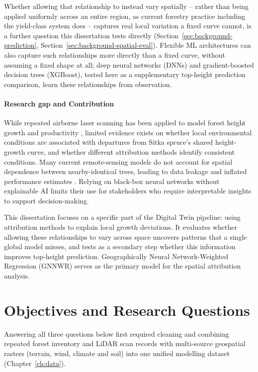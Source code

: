 \documentclass[logo,msc,ai]{infthesis}           %
\begin{document}
Whether allowing that relationship to instead vary spatially -- rather than being applied uniformly across an entire region, as current forestry practice including the yield-class system does -- captures real local variation a fixed curve cannot, is a further question this dissertation tests directly (Section~\ref{sec:background-prediction}, Section~\ref{sec:background-spatial-eval}). Flexible ML architectures can also capture such relationships more directly than a fixed curve, without assuming a fixed shape at all; deep neural networks (DNNs) and gradient-boosted decision trees (XGBoost), tested here as a supplementary top-height prediction comparison, learn these relationships from observation.

\paragraph*{Research gap and Contribution}
While repeated airborne laser scanning has been applied to model forest height growth and productivity \cite{janiec2023Development_C1_SS}, limited evidence exists on whether local environmental conditions are associated with departures from Sitka spruce's shared height-growth curve, and whether different attribution methods identify consistent conditions. Many current remote-sensing models do not account for spatial dependence between nearby-identical trees, leading to data leakage and inflated performance estimates \cite{Karasiak2022Spatial_C5_EVAL, ploton2020Spatial_C5_EVAL, lynch2025Digital_C4_NN}. Relying on black-box neural networks without explainable AI limits their use for stakeholders who require interpretable insights to support decision-making.

This dissertation focuses on a specific part of the Digital Twin pipeline: using attribution methods to explain local growth deviations. It evaluates whether allowing these relationships to vary across space uncovers patterns that a single global model misses, and tests as a secondary step whether this information improves top-height prediction. Geographically Neural Network-Weighted Regression (GNNWR) serves as the primary model for the spatial attribution analysis. 

\section{Objectives and Research Questions}

Answering all three questions below first required cleaning and combining repeated forest
inventory and LiDAR scan records with multi-source geospatial rasters (terrain, wind, climate
and soil) into one unified modelling dataset (Chapter~\ref{ch:data}).
\end{document}
